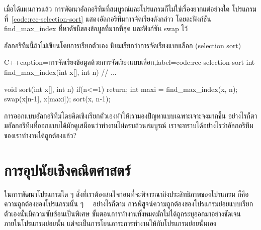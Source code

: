 เมื่อ{\wbr}ได้{\wbr}แผนการ{\wbr}แล้ว การ{\wbr}พัฒนา{\wbr}อัล{\wbr}กอ{\wbr}ริ{\wbr}ทึม{\wbr}ที่{\wbr}สมบูรณ์{\wbr}และ{\wbr}โปรแกรม{\wbr}ก็{\wbr}ไม่{\wbr}ใช่{\wbr}เรื่อง{\wbr}ยาก{\wbr}แต่อย่างใด{\wbr}
โปรแกรม{\wbr}ที่~\ref{code:rec-selection-sort} แสดง{\wbr}อัล{\wbr}กอ{\wbr}ริ{\wbr}ทึม{\wbr}การ{\wbr}จัดเรียง{\wbr}ดังกล่าว{\wbr}
โดย{\wbr}ละ{\wbr}ฟังก์ชัน {\ct find\_max\_index} ที่{\wbr}หา{\wbr}ดัชนี{\wbr}ของ{\wbr}ข้อมูล{\wbr}ที่{\wbr}มาก{\wbr}ที่สุด และ{\wbr}ฟังก์ชัน {\ct
  swap} ไว้{\wbr}

อัล{\wbr}กอ{\wbr}ริ{\wbr}ทึม{\wbr}นี้{\wbr}ถ้า{\wbr}ไม่{\wbr}เขียน{\wbr}โดย{\wbr}การ{\wbr}เรียก{\wbr}ตัวเอง นิยม{\wbr}เรียก{\wbr}ว่า{\wbr}การ{\wbr}จัดเรียง{\wbr}แบบ{\wbr}เลือก (selection
sort)

\latintext
\begin{codelist}{C++}{caption={\thaitext การ{\wbr}จัดเรียง{\wbr}ข้อมูล{\wbr}ด้วย{\wbr}การ{\wbr}จัดเรียง{\wbr}แบบ{\wbr}เลือก\latintext},label=code:rec-selection-sort}
int find_max_index(int x[], int n) { // ... }

void sort(int x[], int n)
{
  if(n<=1)
    return;
  int maxi = find_max_index(x, n);
  swap(x[n-1], x[maxi]);
  sort(x, n-1);
}
\end{codelist}
\thaitext

การ{\wbr}ออกแบบ{\wbr}อัล{\wbr}กอ{\wbr}ริ{\wbr}ทึม{\wbr}โดย{\wbr}คิด{\wbr}เชิง{\wbr}เรียก{\wbr}ตัวเอง{\wbr}ทำ{\wbr}ให้{\wbr}เรา{\wbr}มอง{\wbr}ปัญหา{\wbr}แบบ{\wbr}เฉพาะเจาะจง{\wbr}มาก{\wbr}ขึ้น{\wbr}
อย่างไรก็ตาม{\wbr}อัล{\wbr}กอ{\wbr}ริ{\wbr}ทึม{\wbr}ที่{\wbr}ออกแบบ{\wbr}ได้{\wbr}มัก{\wbr}ดู{\wbr}เสมือน{\wbr}ว่า{\wbr}ทำงาน{\wbr}ไม่{\wbr}ครบถ้วน{\wbr}สมบูรณ์{\wbr}
เรา{\wbr}จะ{\wbr}ทราบ{\wbr}ได้{\wbr}อย่างไร{\wbr}ว่า{\wbr}อัล{\wbr}กอ{\wbr}ริ{\wbr}ทึม{\wbr}ของ{\wbr}เรา{\wbr}ทำงาน{\wbr}ได้{\wbr}ถูกต้อง{\wbr}แล้ว?

\section{การ{\wbr}อุปนัย{\wbr}เชิง{\wbr}คณิตศาสตร์}

ใน{\wbr}การ{\wbr}พัฒนา{\wbr}โปรแกรม{\wbr}ใด ๆ สิ่ง{\wbr}ที่{\wbr}เรา{\wbr}ต้อง{\wbr}สนใจ{\wbr}ก่อน{\wbr}ที่{\wbr}จะ{\wbr}พิจารณา{\wbr}ถึง{\wbr}ประสิทธิภาพ{\wbr}ของ{\wbr}โปรแกรม{\wbr}
ก็{\wbr}คือ{\wbr}ความ{\wbr}ถูกต้อง{\wbr}ของ{\wbr}โปรแกรม{\wbr}นั้น ๆ \ \ อย่างไรก็ตาม{\wbr}
การ{\wbr}พิสูจน์{\wbr}ความ{\wbr}ถูกต้อง{\wbr}ของ{\wbr}โปรแกรมย่อย{\wbr}แบบ{\wbr}เรียก{\wbr}ตัวเอง{\wbr}นั้น{\wbr}มี{\wbr}ความ{\wbr}ซับซ้อน{\wbr}เป็นพิเศษ{\wbr}
ขั้นตอน{\wbr}การ{\wbr}ทำงาน{\wbr}ทั้งหมด{\wbr}มัก{\wbr}ไม่{\wbr}ได้{\wbr}ถูก{\wbr}ระบุ{\wbr}ออก{\wbr}มา{\wbr}อย่าง{\wbr}ชัดเจน{\wbr}ภายใน{\wbr}โปรแกรมย่อย{\wbr}นั้น{\wbr}
แต่{\wbr}จะ{\wbr}เป็น{\wbr}การ{\wbr}โยน{\wbr}ภาระ{\wbr}การ{\wbr}ทำงาน{\wbr}ให้{\wbr}กับ{\wbr}โปรแกรมย่อย{\wbr}นั้น{\wbr}เอง{\wbr}

